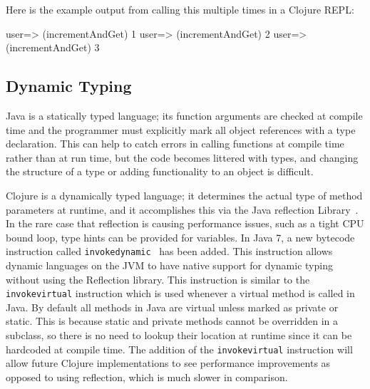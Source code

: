Here is the example output from calling this multiple times in a
Clojure REPL:

user=> (incrementAndGet)
1
user=> (incrementAndGet)
2
user=> (incrementAndGet)
3
 
\subsection{Dynamic Typing}
Java is a statically typed language; its function arguments are
checked at compile time and the programmer must explicitly mark all
object references with a
type declaration. 
This can help to catch errors in calling functions at compile time
rather than at run time, but the code becomes littered with types, and
changing the structure of a type or adding functionality to an object
is difficult. 
    
Clojure is a dynamically typed language; it determines the actual type
of method parameters at runtime, and it accomplishes this via the Java
reflection Library~\cite{reflection}. 
In the rare case that reflection is causing performance issues, such
as a tight CPU bound loop, type hints can be provided for variables. 
In Java 7, a new bytecode instruction called
{\tt invokedynamic}~\cite{invokedynamic} has been added.
This instruction allows dynamic
languages on the JVM to have native support for dynamic typing without
using the Reflection library. 
This instruction is similar to the {\tt invokevirtual} instruction which is
used whenever a virtual method is called in Java. 
By default all methods in Java are virtual unless marked as private or static. 
This is because static and private methods cannot be overridden in a
subclass, so there is no need to lookup their location at runtime
since it can be hardcoded at compile time. 
The addition of the {\tt invokevirtual} instruction will allow future Clojure implementations to see performance improvements as opposed to using reflection, which is much slower in comparison.  

